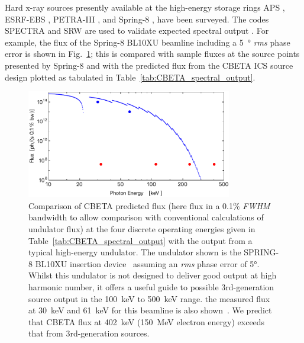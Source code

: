 \documentclass[../main.tex]{subfiles}
\begin{document}
Hard x-ray sources presently available at the high-energy storage rings APS \cite{apsbeamlines}, ESRF-EBS \cite{esrfbeamlines}, PETRA-III \cite{petraiiibeamlines}, and Spring-8 \cite{spring8beamlines}, have been surveyed. The codes \textsc{SPECTRA} \cite{tanaka2001spectra} and \textsc{SRW} \cite{chubar2013wavefront} are used to validate expected spectral output \cite{tanaka2001field}. For example, the flux of the Spring-8 BL10XU beamline  including a 5~\si{\degree} \textit{rms} phase error is shown in Fig.~\ref{fig:ICS_vs_SPRING8_Undulator_Flux}; this is compared with sample fluxes at the source points presented by Spring-8 \cite{spring8beamlines} and with the predicted flux from the CBETA ICS source design plotted as tabulated in Table~\ref{tab:CBETA_spectral_output}.

\begin{figure}[!h]
\centering
\includegraphics[width=0.8\textwidth]{Figures/CBETA_Inverse_Compton_Source_Design/spring8bl10fluxplot.pdf}
\caption{Comparison of CBETA predicted flux (here flux in a 0.1\% \textit{FWHM} bandwidth to allow comparison with conventional calculations of undulator flux) at the four discrete operating energies given in Table~\ref{tab:CBETA_spectral_output} with the output from a typical high-energy undulator. The undulator shown is the SPRING-8 BL10XU insertion device~\cite{spring8beamlines} assuming an \textit{rms} phase error of 5\si{\degree}. Whilst this undulator is not designed to deliver good output at high harmonic number, it offers a useful guide to possible 3rd-generation source output in the 100~\si{\kilo\electronvolt} to 500~\si{\kilo\electronvolt} range. the measured flux at 30~\si{\kilo\electronvolt} and 61~\si{\kilo\electronvolt} for this beamline is also shown~\cite{spring8beamlines}. We predict that CBETA flux at 402~\si{\kilo\electronvolt} (150~\si{\mega\electronvolt} electron energy) exceeds that from 3rd-generation sources.}
\label{fig:ICS_vs_SPRING8_Undulator_Flux}
\end{figure}
\end{document}

